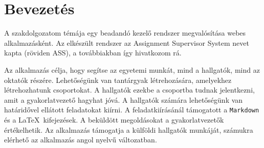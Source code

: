 \chapter{Bevezetés}
\label{ch:intro}

A szakdolgozatom témája egy beadandó kezelő rendszer megvalósítása webes alkalmazásként. Az elkészült rendszer az Assignment Supervisor System nevet kapta (röviden ASS), a továbbiakban így hivatkozom rá.

Az alkalmazás célja, hogy segítse az egyetemi munkát, mind a hallgatók, mind az oktatók részére. Lehetőségünk van tantárgyak létrehozására, amelyekhez létrehozhatunk csoportokat. A hallgatók ezekbe a csoportba tudnak jelentkezni, amit a gyakorlatvezető hagyhat jóvá. A hallgatók számára lehetőségünk van határidővel ellátott feladatokat kiírni. A feladatkiírásánál támogatott a \texttt{Markdown} és a \LaTeX\ kifejezések. A beküldött megoldásokat a gyakorlatvezetők értékelhetik. Az alkalmazás támogatja a külföldi hallgatók munkáját, számukra elérhető az alkalmazás angol nyelvű változatban.